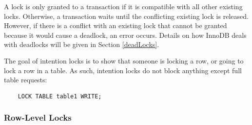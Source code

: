 \documentclass[12pt]{article}
\begin{document}
\vspace{0.3cm}

A lock is only granted to a transaction if it is compatible with all other existing locks. Otherwise, a transaction waits until the conflicting existing lock is released. However, if there is a conflict with an existing lock that cannot be granted because it would cause a deadlock, an error occurs. Details on how InnoDB deals with deadlocks will be given in Section \ref{deadLocks}.

The goal of intention locks is to show that someone is locking a row, or going to lock a row in a table. As such, intention locks do not block anything except full table requests:

\begin{verbatim}
    LOCK TABLE table1 WRITE;
\end{verbatim}


\subsubsection{Row-Level Locks}
\label{rowLevelLocks} 
\end{document}
